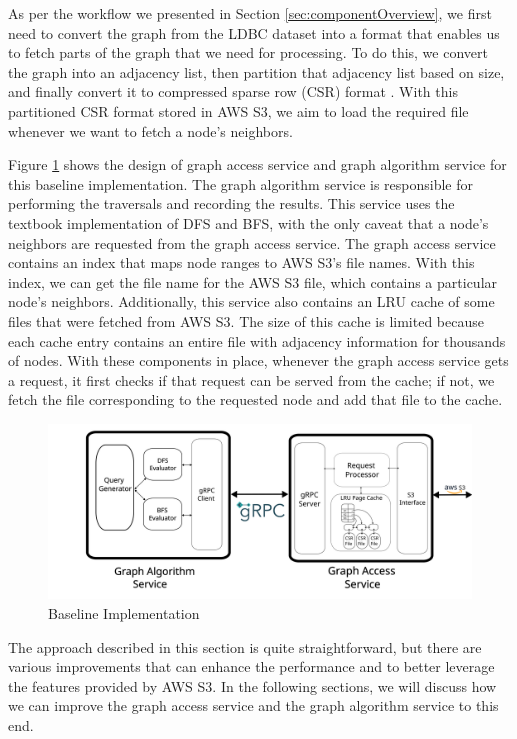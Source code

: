 \medskip
As per the workflow we presented in Section \ref{sec:componentOverview}, we
first need to convert the graph from the LDBC dataset into a format that
enables us to fetch parts of the graph that we need for processing. To
do this, we convert the graph into an adjacency list, then partition that
adjacency list based on size, and finally convert it to compressed sparse
row (CSR) format \cite{duff1984computer}. With this partitioned CSR format stored
in AWS S3, we aim to load the required file whenever we want to fetch a node's
neighbors.

\medskip
Figure \ref{fig:baselineImpl} shows the design of graph access service and graph
algorithm service for this baseline implementation. The graph algorithm service
is responsible for performing the traversals and recording the results. This
service uses the textbook implementation of DFS and BFS, with the only caveat
that a node's neighbors are requested from the graph access service. The graph
access service contains an index that maps node ranges to AWS S3's file names. With
this index, we can get the file name for the AWS S3 file, which contains a particular
node's neighbors. Additionally, this service also contains an LRU cache of some
files that were fetched from AWS S3. The size of this cache is limited because each
cache entry contains an entire file with adjacency information for
thousands of nodes. With these components in place, whenever the graph access
service gets a request, it first checks if that request can be served from the
cache; if not, we fetch the file corresponding to the requested node and add
that file to the cache.
\begin{figure}[ht]
    \centering
    \includegraphics[width=\textwidth]{figures/baseline.png}
    \caption{Baseline Implementation}
    \label{fig:baselineImpl}
\end{figure}

\medskip
The approach described in this section is quite straightforward, but there are
various improvements that can enhance the performance and to better 
leverage the features provided by AWS S3. In the following sections, we will
discuss how we can improve the graph access service
and the graph algorithm service to this end. 

